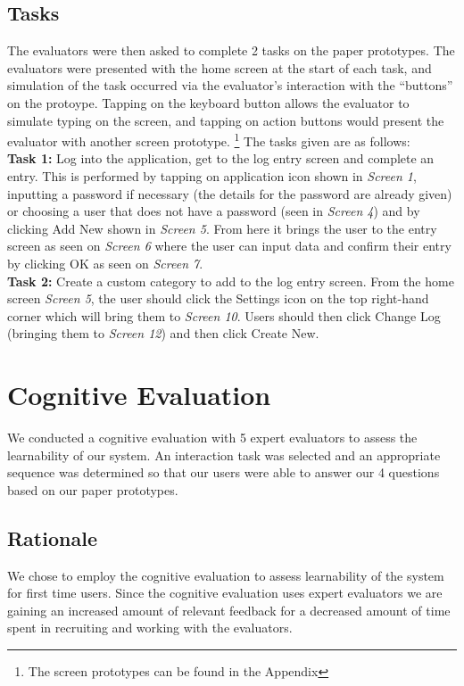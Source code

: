 \documentclass[pdftex,12pt,a4paper]{report}
\begin{document}
\section{Tasks}
The evaluators were then asked to complete 2 tasks on the paper prototypes. The evaluators were presented with the home screen at the start of each task, and simulation of the task occurred via the evaluator's interaction with the ``buttons'' on the protoype. Tapping on the keyboard button allows the evaluator to simulate typing on the screen, and tapping on action buttons would present the evaluator with another screen prototype. \footnote{The screen prototypes can be found in the Appendix} The tasks given are as follows:
\vspace{0.7cm}
\\\textbf{Task 1:} Log into the application, get to the log entry screen and complete an entry.
This is performed by tapping on application icon shown in \textit{Screen 1}, inputting a password
if necessary (the details for the password are already given) or choosing a user that does
not have a password (seen in \textit{Screen 4}) and by clicking Add New shown in \textit{Screen 5}. From here it brings the user to the entry screen as seen on \textit{Screen 6} where the user can input data and confirm their entry by clicking OK as seen on \textit{Screen 7}.
\vspace{0.7cm}
\\\textbf{Task 2:} Create a custom category to add to the log entry screen. From the home screen
\textit{Screen 5}, the user should click the Settings icon on the top right-hand corner which will
bring them to \textit{Screen 10}. Users should then click Change Log (bringing them to \textit{Screen 12}) and then click Create New.

\chapter{Cognitive Evaluation}
We conducted a cognitive evaluation with 5 expert evaluators to assess the learnability of our system. An interaction task was selected and an appropriate sequence was determined so that our users were able to answer our 4 questions based on our paper prototypes.

\section{Rationale}
We chose to employ the cognitive evaluation to assess learnability of the system for first time users. Since the cognitive evaluation uses expert evaluators we are gaining an increased amount of relevant feedback for a decreased amount of time spent in recruiting and working with the evaluators.
\end{document}

